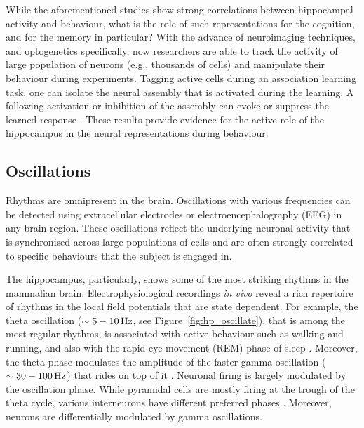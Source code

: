     While the aforementioned studies show strong correlations between
    hippocampal activity and behaviour, what is the role of such representations
    for the cognition, and for the memory in particular? With the advance of
    neuroimaging techniques, and optogenetics specifically, now researchers are
    able to track the activity of large population of neurons (e.g., thousands
    of cells) and manipulate their behaviour during experiments. Tagging active
    cells during an association learning task, one can isolate the neural
    assembly that is activated during the learning. A following activation or
    inhibition of the assembly can evoke or suppress the learned response
    \citep{Cowansage2014, Tanaka2014}. These results provide evidence for the
    active role of the hippocampus in the neural representations during
    behaviour.

  \subsection{Oscillations}
    Rhythms are omnipresent in the brain. Oscillations with various frequencies
    can be detected using extracellular electrodes or electroencephalography
    (EEG) in any brain region. These oscillations reflect the underlying
    neuronal activity that is synchronised across large populations of cells
    and are often strongly correlated to specific behaviours that the subject is
    engaged in.

    The hippocampus, particularly, shows some of the most striking rhythms in
    the mammalian brain. Electrophysiological recordings \textit{in vivo}
    reveal a rich repertoire of rhythms in the local field potentials that are
    state dependent. For example, the theta oscillation ($\sim 5-10 \rm\, Hz$,
    see Figure~\ref{fig:hp_oscillate}), that is among the most regular rhythms,
    is associated with active behaviour such as walking and running, and also
    with the rapid-eye-movement (REM) phase of sleep \citep{Jung1938,
    Buzsaki2002}. Moreover, the theta phase modulates the amplitude of the
    faster gamma oscillation ($\sim 30-100 \rm\, Hz$) that rides on top of it
    \citep{Bragin1995, Buzsaki2002}. Neuronal firing is largely modulated by
    the oscillation phase. While pyramidal cells are mostly firing at the
    trough of the theta cycle, various interneurons have different preferred
    phases \citep{Klausberger2008, Klausberger2009}. Moreover, neurons are
    differentially modulated by gamma oscillations.

